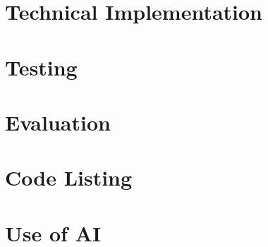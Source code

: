 \documentclass[10pt]{report}
\newcommand{\Input}[1]{}
\begin{document}
\chapter{Technical Implementation}
\Input{3-implementation.tex}

\chapter{Testing}
\Input{4-testing.tex}

\chapter{Evaluation}
\Input{5-evaluation.tex}

\appendix

\chapter{Code Listing}
\Input{a-listing.tex}

\chapter{Use of AI}
\Input{b-ai.tex}

\printbibliography[heading=bibnumbered,title=References]
\end{document}
